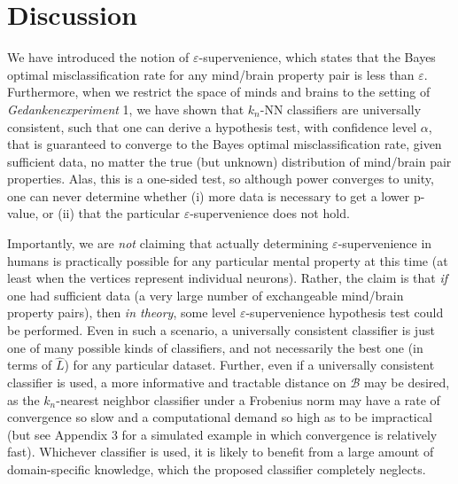 \documentclass{article}
\newcommand{\mB}{\mathcal{B}}
\newcommand{\eps}{\varepsilon}
\providecommand{\mh}[1]{\widehat{#1}}
\begin{document}
\section*{Discussion}


We have introduced the notion of $\eps$-supervenience, which states that the Bayes optimal misclassification rate for any mind/brain property pair is less than $\eps$.  Furthermore, when we restrict the space of minds and brains to the setting of \emph{Gedankenexperiment}  1, we have shown that $k_n$-NN classifiers are universally consistent, such that one can derive a hypothesis test, with confidence level $\alpha$, that is guaranteed to converge to the Bayes optimal misclassification rate, given sufficient data, no matter the true (but unknown) distribution of mind/brain pair properties.  Alas, this is a one-sided test, so although power converges to unity, one can never determine whether (i) more data is necessary to get a lower p-value, or (ii) that the particular $\eps$-supervenience does not hold.  


Importantly, we are \emph{not} claiming that actually determining $\eps$-supervenience in humans is practically possible for any particular mental property at this time (at least when the vertices represent individual neurons).  Rather, the claim is that \emph{if} one had sufficient data (a very large number of exchangeable mind/brain property pairs), then \emph{in theory}, some level $\eps$-supervenience hypothesis test could be performed.  Even in such a scenario, a universally consistent classifier is just one of many possible kinds of classifiers, and not necessarily the best one (in terms of $\mh{L}$) for any particular dataset.  Further, even if a universally consistent classifier is used, a more informative and tractable distance on $\mB$ may be desired, as the $k_n$-nearest neighbor classifier under a Frobenius norm may have a rate of convergence so slow and a computational demand so high as to be impractical (but see Appendix 3 for a simulated example in which convergence is relatively fast).  Whichever classifier is used, it is likely to benefit from a large amount of domain-specific knowledge, which the proposed classifier completely neglects. 
\end{document}
